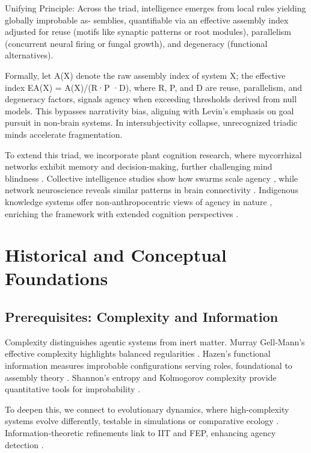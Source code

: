 \documentclass{article}
\begin{document}
Unifying Principle: Across the triad, intelligence emerges from local rules yielding globally improbable as-
semblies, quantifiable via an effective assembly index adjusted for reuse (motifs like synaptic patterns or root
modules), parallelism (concurrent neural firing or fungal growth), and degeneracy (functional alternatives).

Formally, let A(X) denote the raw assembly index of system X; the effective index EA(X) = A(X)/(R·P ·D),
where R, P, and D are reuse, parallelism, and degeneracy factors, signals agency when exceeding thresholds
derived from null models. This bypasses narrativity bias, aligning with Levin’s emphasis on goal pursuit in
non-brain systems. In intersubjectivity collapse, unrecognized triadic minds accelerate fragmentation.

To extend this triad, we incorporate plant cognition research, where mycorrhizal networks exhibit memory and decision-making, further challenging mind blindness \citep{calvo2020plants}. Collective intelligence studies show how swarms scale agency \citep{camazine2001self}, while network neuroscience reveals similar patterns in brain connectivity \citep{bassett2017network}. Indigenous knowledge systems offer non-anthropocentric views of agency in nature \citep{kimmerer2013braiding}, enriching the framework with extended cognition perspectives \citep{clark2010supersizing}.

\section{Historical and Conceptual Foundations}
\label{sec:foundations}

\subsection{Prerequisites: Complexity and Information}
Complexity distinguishes agentic systems from inert matter. Murray Gell-Mann’s effective complexity highlights balanced regularities \citep{adami2012use}. Hazen’s functional information measures improbable configurations serving roles, foundational to assembly theory \citep{hazen2007functional}. Shannon’s entropy and Kolmogorov complexity provide quantitative tools for improbability \citep{shannon1948mathematical, kolmogorov1965three}.

To deepen this, we connect to evolutionary dynamics, where high-complexity systems evolve differently, testable in simulations or comparative ecology \citep{camazine2001self}. Information-theoretic refinements link to IIT and FEP, enhancing agency detection \citep{tononi2004information, friston2010free}.
\end{document}

